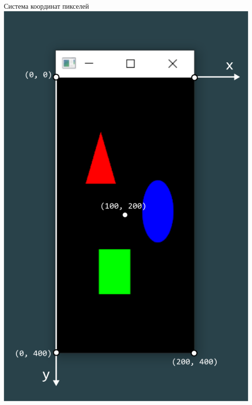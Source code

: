 \documentclass{article}
\begin{document}
\vspace{0.5cm}
\begin{minipage}{0.5\textwidth}
\begin{center}
Система координат пикселей
\includegraphics[scale=1]{../images/system_pixels_narrow.png}
\end{center}
\end{minipage}
\end{document}
